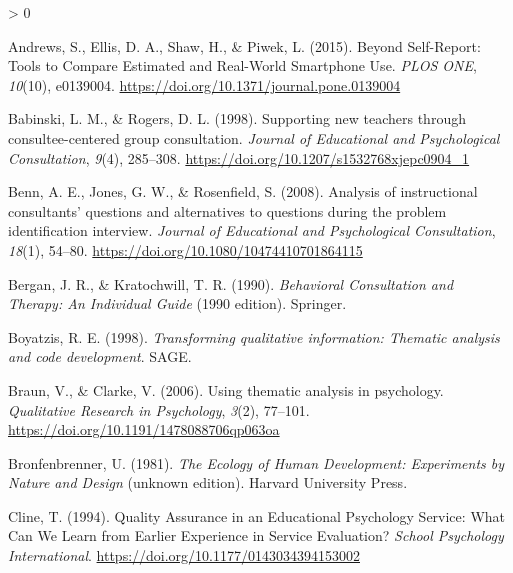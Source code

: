 \documentclass[
  english,
  man,floatsintext]{apa6}
\newlength{\cslhangindent}
\newenvironment{CSLReferences}[2] %
 {%
  \setlength{\parindent}{0pt}
  \ifodd #1 \everypar{\setlength{\hangindent}{\cslhangindent}}\ignorespaces\fi
  \ifnum #2 > 0
  \setlength{\parskip}{#2\baselineskip}
  \fi
 }%
 {}
\begin{document}
\hypertarget{refs}{}
\begin{CSLReferences}{1}{0}
\leavevmode\hypertarget{ref-andrewsSelfReportToolsCompare2015a}{}%
Andrews, S., Ellis, D. A., Shaw, H., \& Piwek, L. (2015). Beyond {Self}-{Report}: {Tools} to {Compare Estimated} and {Real}-{World Smartphone Use}. \emph{PLOS ONE}, \emph{10}(10), e0139004. \url{https://doi.org/10.1371/journal.pone.0139004}

\leavevmode\hypertarget{ref-babinskiSupportingNewTeachers1998}{}%
Babinski, L. M., \& Rogers, D. L. (1998). Supporting new teachers through consultee-centered group consultation. \emph{Journal of Educational and Psychological Consultation}, \emph{9}(4), 285--308. \url{https://doi.org/10.1207/s1532768xjepc0904_1}

\leavevmode\hypertarget{ref-bennAnalysisInstructionalConsultants2008}{}%
Benn, A. E., Jones, G. W., \& Rosenfield, S. (2008). Analysis of instructional consultants' questions and alternatives to questions during the problem identification interview. \emph{Journal of Educational and Psychological Consultation}, \emph{18}(1), 54--80. \url{https://doi.org/10.1080/10474410701864115}

\leavevmode\hypertarget{ref-berganBehavioralConsultationTherapy1990}{}%
Bergan, J. R., \& Kratochwill, T. R. (1990). \emph{Behavioral {Consultation} and {Therapy}: {An Individual Guide}} (1990 edition). {Springer}.

\leavevmode\hypertarget{ref-boyatzisTransformingQualitativeInformation1998a}{}%
Boyatzis, R. E. (1998). \emph{Transforming qualitative information: Thematic analysis and code development}. {SAGE}.

\leavevmode\hypertarget{ref-braunUsingThematicAnalysis2006}{}%
Braun, V., \& Clarke, V. (2006). Using thematic analysis in psychology. \emph{Qualitative Research in Psychology}, \emph{3}(2), 77--101. \url{https://doi.org/10.1191/1478088706qp063oa}

\leavevmode\hypertarget{ref-bronfenbrennerEcologyHumanDevelopment1981}{}%
Bronfenbrenner, U. (1981). \emph{The {Ecology} of {Human Development}: {Experiments} by {Nature} and {Design}} (unknown edition). {Harvard University Press}.

\leavevmode\hypertarget{ref-clineQualityAssuranceEducational1994a}{}%
Cline, T. (1994). Quality {Assurance} in an {Educational Psychology Service}: {What Can We Learn} from {Earlier Experience} in {Service Evaluation}? \emph{School Psychology International}. \url{https://doi.org/10.1177/0143034394153002}


\end{CSLReferences}
\end{document}
